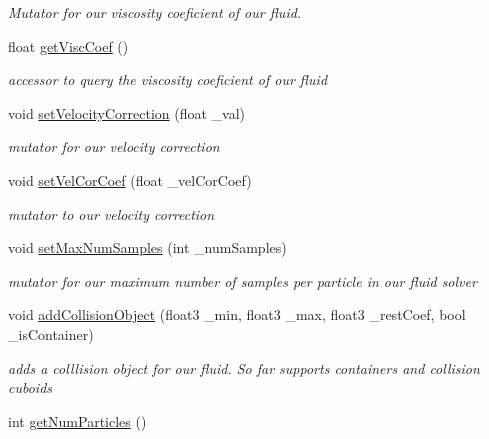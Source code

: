 \begin{DoxyCompactItemize}
\begin{DoxyCompactList}\small\item\em Mutator for our viscosity coeficient of our fluid. \end{DoxyCompactList}\item 
\hypertarget{class_s_p_h_engine_a6d3709693af1379db5b60b02171d8c8b}{float \hyperlink{class_s_p_h_engine_a6d3709693af1379db5b60b02171d8c8b}{get\-Visc\-Coef} ()}\label{class_s_p_h_engine_a6d3709693af1379db5b60b02171d8c8b}

\begin{DoxyCompactList}\small\item\em accessor to query the viscosity coeficient of our fluid \end{DoxyCompactList}\item 
void \hyperlink{class_s_p_h_engine_a25796b907bd55473b09ac5683918c0c5}{set\-Velocity\-Correction} (float \-\_\-val)
\begin{DoxyCompactList}\small\item\em mutator for our velocity correction \end{DoxyCompactList}\item 
\hypertarget{class_s_p_h_engine_a6b418198ceab591b1abfa5f645dbc9d7}{void \hyperlink{class_s_p_h_engine_a6b418198ceab591b1abfa5f645dbc9d7}{set\-Vel\-Cor\-Coef} (float \-\_\-vel\-Cor\-Coef)}\label{class_s_p_h_engine_a6b418198ceab591b1abfa5f645dbc9d7}

\begin{DoxyCompactList}\small\item\em mutator to our velocity correction \end{DoxyCompactList}\item 
void \hyperlink{class_s_p_h_engine_aad9d9bc9a1a7e5f64a5e045c339f8b3e}{set\-Max\-Num\-Samples} (int \-\_\-num\-Samples)
\begin{DoxyCompactList}\small\item\em mutator for our maximum number of samples per particle in our fluid solver \end{DoxyCompactList}\item 
void \hyperlink{class_s_p_h_engine_afe2b02e535cf064f91f2de4312c8ae39}{add\-Collision\-Object} (float3 \-\_\-min, float3 \-\_\-max, float3 \-\_\-rest\-Coef, bool \-\_\-is\-Container)
\begin{DoxyCompactList}\small\item\em adds a colllision object for our fluid. So far supports containers and collision cuboids \end{DoxyCompactList}\item 
\hypertarget{class_s_p_h_engine_a387ab48532ca20b2eb31319e862e243b}{int \hyperlink{class_s_p_h_engine_a387ab48532ca20b2eb31319e862e243b}{get\-Num\-Particles} ()}\label{class_s_p_h_engine_a387ab48532ca20b2eb31319e862e243b}


\end{DoxyCompactItemize}
